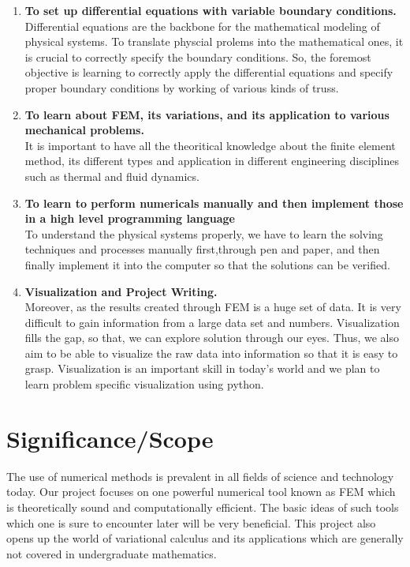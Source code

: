 \begin{enumerate}
 \item \textbf{To set up differential equations with variable boundary conditions.}\\
	Differential equations are the backbone for the mathematical modeling of physical systems. To translate physcial prolems into  the mathematical ones,  it is crucial to correctly specify the boundary conditions.  So, the foremost objective is learning to correctly apply the differential equations  and specify proper boundary conditions by working of various kinds of truss. 

 \item \textbf{To learn about FEM, its variations, and its application to various
 mechanical problems.}\\
 It is important to have all the theoritical knowledge about the finite element method, its different types and application in different engineering disciplines such as thermal and fluid dynamics.

 \item  \textbf{To learn to perform numericals manually and then implement
 those in a high level programming language}\\
 To understand the physical systems properly, we have to learn the solving techniques and processes manually first,through pen and paper, and then finally implement it into the computer so that the solutions can be verified.


 \item \textbf{Visualization and Project Writing.}\\
Moreover, as the results created through FEM is a huge set of data. It is very difficult to gain information from a large data set and numbers. Visualization fills the gap, so that, we can explore solution through our eyes. Thus, we  also aim to be able to visualize the raw data into information so that it is easy to grasp. Visualization is an important skill in today's world and we plan to learn problem specific visualization using python.

\end{enumerate}



\section{\bf Significance/Scope}


The use of numerical methods is prevalent in all fields of science and technology today. Our project focuses on one powerful numerical tool known as FEM which is theoretically sound and computationally efficient. The basic ideas of such tools which one is sure to encounter later will be very beneficial. This project also opens up the world of variational calculus and its applications which are generally not covered in undergraduate mathematics.

